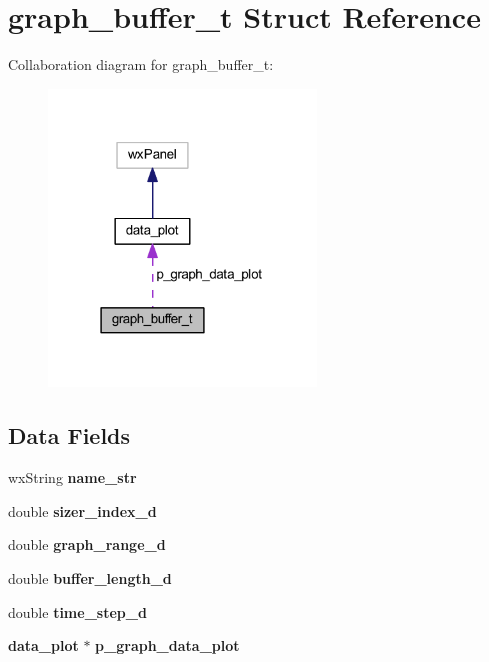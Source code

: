 \section{graph\+\_\+buffer\+\_\+t Struct Reference}
\label{structgraph__buffer__t}


Collaboration diagram for graph\+\_\+buffer\+\_\+t\+:\nopagebreak
\begin{figure}[H]
\begin{center}
\leavevmode
\includegraphics[width=202pt]{structgraph__buffer__t__coll__graph}
\end{center}
\end{figure}
\subsection*{Data Fields}
\begin{DoxyCompactItemize}
\item 
\mbox{\label{structgraph__buffer__t_a4f420117d8c68001f3c555687fee0d84}} 
wx\+String {\bfseries name\+\_\+str}
\item 
\mbox{\label{structgraph__buffer__t_aae99f717aadbf88f890c71a293468af8}} 
double {\bfseries sizer\+\_\+index\+\_\+d}
\item 
\mbox{\label{structgraph__buffer__t_acdc7d1aa78e855984e1073f7e975258d}} 
double {\bfseries graph\+\_\+range\+\_\+d}
\item 
\mbox{\label{structgraph__buffer__t_a4a18a8710e0a906dd8a0d63fbf7c529e}} 
double {\bfseries buffer\+\_\+length\+\_\+d}
\item 
\mbox{\label{structgraph__buffer__t_a812bd0a869f23ca14d35715545713db0}} 
double {\bfseries time\+\_\+step\+\_\+d}
\item 
\mbox{\label{structgraph__buffer__t_ac23ca840d85a64471e2c2d46b38994a4}} 
\textbf{ data\+\_\+plot} $\ast$ {\bfseries p\+\_\+graph\+\_\+data\+\_\+plot}
\end{DoxyCompactItemize}


